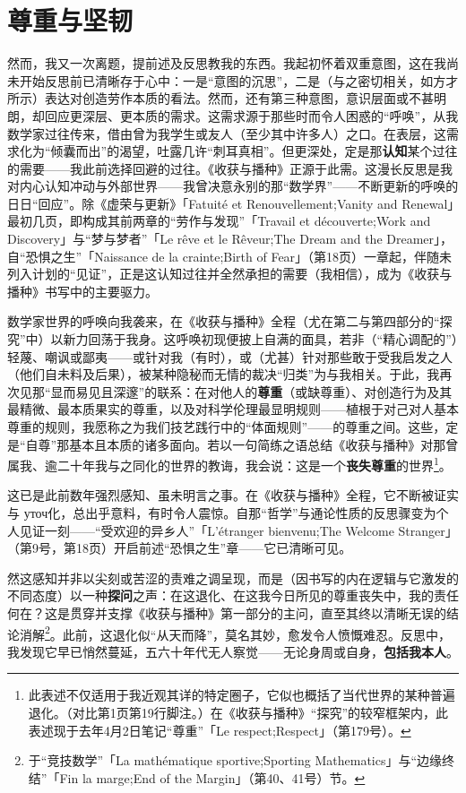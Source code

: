 \section{尊重与坚韧}

然而，我又一次离题，提前述及反思教我的东西。我起初怀着双重意图，这在我尚未开始反思前已清晰存于心中：一是“意图的沉思”，二是（与之密切相关，如方才所示）表达对创造劳作本质的看法。然而，还有第三种意图，意识层面或不甚明朗，却回应更深层、更本质的需求。这需求源于那些时而令人困惑的“呼唤”，从我数学家过往传来，借由曾为我学生或友人（至少其中许多人）之口。在表层，这需求化为“倾囊而出”的渴望，吐露几许“刺耳真相”。但更深处，定是那\textbf{认知}某个过往的需要——我此前选择回避的过往。《收获与播种》正源于此需。这漫长反思是我对内心认知冲动与外部世界——我曾决意永别的那“数学界”——不断更新的呼唤的日日“回应”。除《虚荣与更新》「Fatuité et Renouvellement;Vanity and Renewal」最初几页，即构成其前两章的“劳作与发现”「Travail et découverte;Work and Discovery」与“梦与梦者”「Le rêve et le Rêveur;The Dream and the Dreamer」，自“恐惧之生”「Naissance de la crainte;Birth of Fear」（第18页）一章起，伴随未列入计划的“见证”，正是这认知过往并全然承担的需要（我相信），成为《收获与播种》书写中的主要驱力。

数学家世界的呼唤向我袭来，在《收获与播种》全程（尤在第二与第四部分的“探究”中）以新力回荡于我身。这呼唤初现便披上自满的面具，若非（“精心调配的”）轻蔑、嘲讽或鄙夷——或针对我（有时），或（尤甚）针对那些敢于受我启发之人（他们自未料及后果），被某种隐秘而无情的裁决“归类”为与我相关。于此，我再次见那“显而易见且深邃”的联系：在对他人的\textbf{尊重}（或缺尊重）、对创造行为及其最精微、最本质果实的尊重，以及对科学伦理最显明规则——植根于对己对人基本尊重的规则，我愿称之为我们技艺践行中的“体面规则”——的尊重之间。这些，定是“自尊”那基本且本质的诸多面向。若以一句简练之语总结《收获与播种》对那曾属我、逾二十年我与之同化的世界的教诲，我会说：这是一个\textbf{丧失尊重}的世界\footnote{此表述不仅适用于我近观其详的特定圈子，它似也概括了当代世界的某种普遍退化。（对比第1页第19行脚注。）在《收获与播种》“探究”的较窄框架内，此表述现于去年4月2日笔记“尊重”「Le respect;Respect」（第179号）。}。

这已是此前数年强烈感知、虽未明言之事。在《收获与播种》全程，它不断被证实与 уточ化，总出乎意料，有时令人震惊。自那“哲学”与通论性质的反思骤变为个人见证一刻——“受欢迎的异乡人”「L'étranger bienvenu;The Welcome Stranger」（第9号，第18页）开启前述“恐惧之生”章——它已清晰可见。

然这感知并非以尖刻或苦涩的责难之调呈现，而是（因书写的内在逻辑与它激发的不同态度）以一种\textbf{探问}之声：在这退化、在这我今日所见的尊重丧失中，我的责任何在？这是贯穿并支撑《收获与播种》第一部分的主问，直至其终以清晰无误的结论消解\footnote{于“竞技数学”「La mathématique sportive;Sporting Mathematics」与“边缘终结”「Fin la marge;End of the Margin」（第40、41号）节。}。此前，这退化似“从天而降”，莫名其妙，愈发令人愤慨难忍。反思中，我发现它早已悄然蔓延，五六十年代无人察觉——无论身周或自身，\textbf{包括我本人}。

